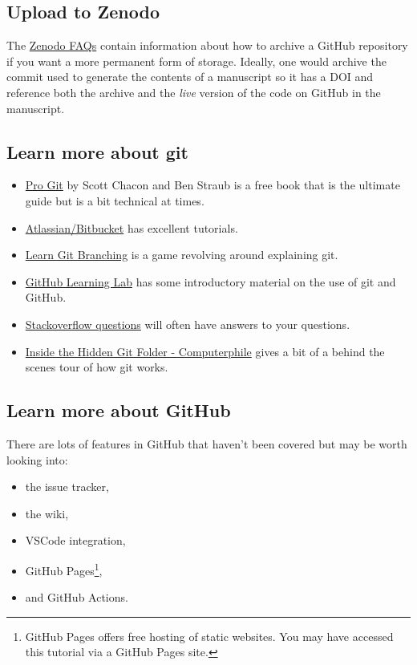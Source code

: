 \documentclass[11pt,onecolumn]{scrartcl}
\begin{document}
\subsection{Upload to Zenodo}
\label{sec:org5152335}

The \href{https://help.zenodo.org/}{Zenodo FAQs} contain information about how to archive a GitHub repository if
you want a more permanent form of storage. Ideally, one would archive the commit
used to generate the contents of a manuscript so it has a DOI and reference both
the archive and the \emph{live} version of the code on GitHub in the manuscript.

\subsection{Learn more about git}
\label{sec:org8a3724e}

\begin{itemize}
\item \href{https://git-scm.com/book/en/v2}{Pro Git} by Scott Chacon and Ben Straub is a free book that is the ultimate
guide but is a bit technical at times.
\item \href{https://www.atlassian.com/git/tutorials}{Atlassian/Bitbucket} has excellent tutorials.
\item \href{https://learngitbranching.js.org/}{Learn Git Branching} is a game revolving around explaining git.
\item \href{https://lab.github.com/}{GitHub Learning Lab} has some introductory material on the use of git and
GitHub.
\item \href{https://stackoverflow.com/questions/tagged/git}{Stackoverflow questions} will often have answers to your questions.
\item \href{https://youtu.be/bSA91XTzeuA}{Inside the Hidden Git Folder - Computerphile} gives a bit of a behind the
scenes tour of how git works.
\end{itemize}

\subsection{Learn more about GitHub}
\label{sec:orgb4f3a10}

There are lots of features in GitHub that haven't been covered but may be worth
looking into:

\begin{itemize}
\item the issue tracker,
\item the wiki,
\item VSCode integration,
\item GitHub Pages\footnote{GitHub Pages offers free hosting of static websites. You may have accessed this tutorial via a GitHub Pages site.},
\item and GitHub Actions.
\end{itemize}
\end{document}
